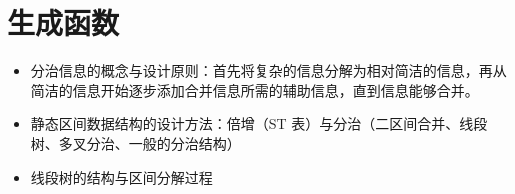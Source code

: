 \chapter{生成函数}


\begin{summary}
\begin{itemize}
    \item 分治信息的概念与设计原则：首先将复杂的信息分解为相对简洁的信息，再从简洁的信息开始逐步添加合并信息所需的辅助信息，直到信息能够合并。
    \item 静态区间数据结构的设计方法：倍增（ST 表）与分治（二区间合并、线段树、多叉分治、一般的分治结构）
    \item 线段树的结构与区间分解过程
\end{itemize}
\end{summary}


